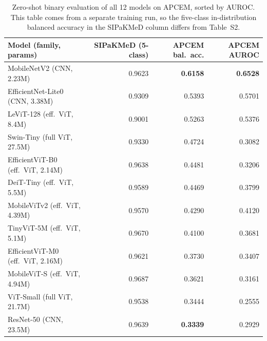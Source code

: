 \documentclass[12pt,letterpaper]{article}
\begin{document}
\begin{table}[htbp]
\centering
\caption{Zero-shot binary evaluation of all 12 models on APCEM, sorted by AUROC. This table comes from a separate training run, so the five-class in-distribution balanced accuracy in the SIPaKMeD column differs from Table~S2.}
\label{tab:apcem}
\small
\begin{tabular}{lrrr}
\toprule
Model (family, params) & SIPaKMeD (5-class) & APCEM bal.\ acc. & APCEM AUROC \\
\midrule
MobileNetV2 (CNN, 2.23M) & 0.9623 & \textbf{0.6158} & \textbf{0.6528} \\
EfficientNet-Lite0 (CNN, 3.38M) & 0.9309 & 0.5393 & 0.5701 \\
LeViT-128 (eff.\ ViT, 8.4M) & 0.9001 & 0.5263 & 0.5376 \\
Swin-Tiny (full ViT, 27.5M) & 0.9330 & 0.4724 & 0.3082 \\
EfficientViT-B0 (eff.\ ViT, 2.14M) & 0.9638 & 0.4481 & 0.3206 \\
DeiT-Tiny (eff.\ ViT, 5.5M) & 0.9589 & 0.4469 & 0.3799 \\
MobileViTv2 (eff.\ ViT, 4.39M) & 0.9570 & 0.4290 & 0.4120 \\
TinyViT-5M (eff.\ ViT, 5.1M) & 0.9670 & 0.4100 & 0.3681 \\
EfficientViT-M0 (eff.\ ViT, 2.16M) & 0.9621 & 0.3730 & 0.3407 \\
MobileViT-S (eff.\ ViT, 4.94M) & 0.9687 & 0.3621 & 0.3161 \\
ViT-Small (full ViT, 21.7M) & 0.9538 & 0.3444 & 0.2555 \\
ResNet-50 (CNN, 23.5M) & 0.9639 & \textbf{0.3339} & 0.2929 \\
\bottomrule
\end{tabular}
\end{table}
\end{document}
